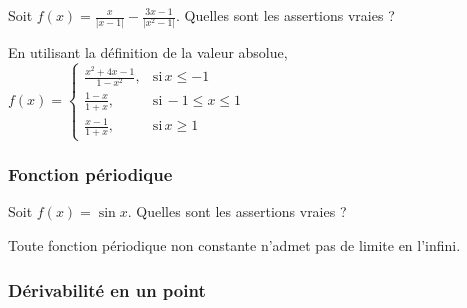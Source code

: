 \begin{question} 
Soit $f(x)= \frac{x}{|x-1|}-\frac{3x-1}{|x^2-1|}$. Quelles sont les assertions vraies ?
\begin{answers}

    
    
    
    


\end{answers}
\begin{explanations}
En utilisant la définition de la valeur absolue, 
 $f(x)=\left\{\begin{array}{ccc}\frac{x^2+4x-1}{1-x^2},& \mbox{si} \, x \le -1 \\ 
 \frac{1-x}{1+x} ,& \mbox{si} \,  -1\le x \le 1\\
   \frac{x-1}{1+x} ,& \mbox{si} \,  x \ge 1 \end{array}\right.$
\end{explanations}

\end{question}

\subsubsection{Fonction périodique}

\begin{question} 
Soit $f(x)= \sin x$. Quelles sont les assertions vraies ?
\begin{answers}

     
    
    
    

 
\end{answers}
\begin{explanations}
Toute fonction périodique non constante n'admet pas de limite en l'infini.
\end{explanations}

\end{question}



\subsubsection{Dérivabilité en un point}

